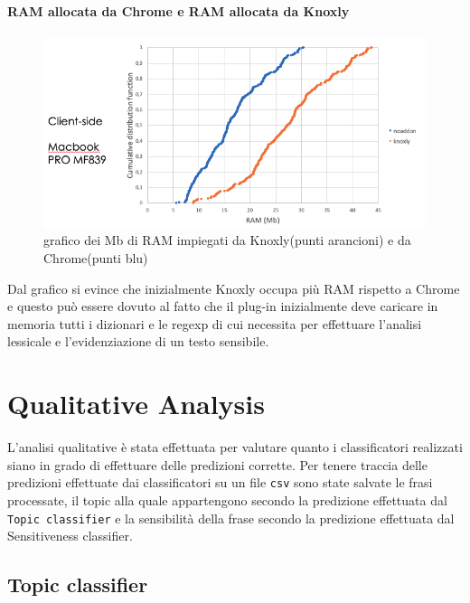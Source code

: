 \paragraph{RAM allocata da Chrome e RAM allocata da Knoxly}
\begin{figure}[h!t]
    \centering
    \includegraphics[width=15cm]{Figure/quantitativa/RAM-client.png}
    \caption{grafico dei Mb di RAM impiegati da Knoxly(punti arancioni) e da Chrome(punti blu)}
    \label{fig:clientRAM}
\end{figure}
\FloatBarrier
Dal grafico si evince che inizialmente Knoxly occupa più RAM rispetto a Chrome e questo può essere dovuto al fatto che il plug-in inizialmente deve caricare in memoria tutti i dizionari e le regexp di cui necessita per effettuare l'analisi lessicale e l'evidenziazione di un testo sensibile.



\section{Qualitative Analysis}
\label{sec:qualitative}
L'analisi qualitative è stata effettuata per valutare quanto i classificatori realizzati siano in grado di effettuare delle predizioni corrette. Per tenere traccia delle predizioni effettuate dai classificatori su un file {\tt csv} sono state salvate le frasi processate, il topic alla quale appartengono secondo la predizione effettuata dal {\tt Topic classifier} e la sensibilità della frase secondo la predizione effettuata dal {\\ Sensitiveness classifier}.

\subsection{Topic classifier}
\label{sec:qualTopic}

